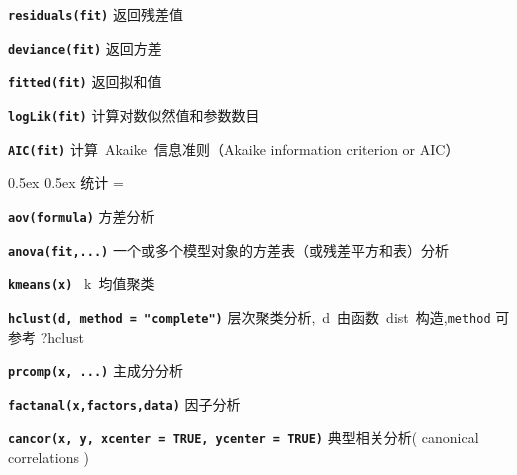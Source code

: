 \documentclass[landscape]{article}
\makeatletter
\renewcommand\section{\@startsection{section}{1}{0mm}%
                                     {0.5ex}%
                                     {0.5ex}%
                                {\color{black}\normalfont\large\bfseries}}
\newcommand{\code}{\texttt}
\newcommand{\bcode}[1]{\texttt{\textbf{#1}}}
\makeatother
\begin{document}
\begin{multicols*}{3}
\bcode{residuals(fit)}  返回残差值

\bcode{deviance(fit)}  返回方差

\bcode{fitted(fit)}  返回拟和值

\bcode{logLik(fit)}  计算对数似然值和参数数目

\bcode{AIC(fit)}  计算~Akaike~信息准则（Akaike information criterion or AIC）

\section{统计}
\everypar={\hangindent=9mm}

\bcode{aov(formula)} 方差分析

\bcode{anova(fit,...)} 一个或多个模型对象的方差表（或残差平方和表）分析


\bcode{kmeans(x)}   ~k~均值聚类

\bcode{hclust(d, method = "complete")} 层次聚类分析,~d~由函数~dist~构造,\code{method} 可参考 ?hclust

\bcode{prcomp(x, ...)}  主成分分析

\bcode{factanal(x,factors,data)}    因子分析

\bcode{cancor(x, y, xcenter = TRUE, ycenter = TRUE)}   典型相关分析( canonical correlations )





\end{multicols*}
\end{document}
